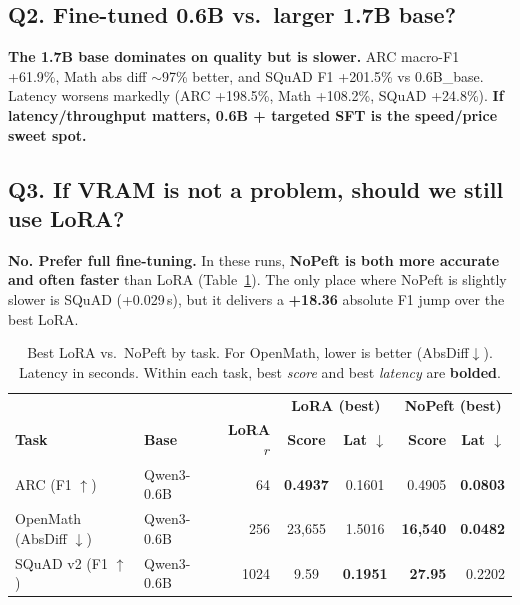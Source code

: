 \documentclass[11pt,a4paper]{article}
\begin{document}
\subsection*{Q2. Fine-tuned 0.6B vs.\ larger 1.7B base?}
\textbf{The 1.7B base dominates on quality but is slower.} 
ARC macro-F1 +61.9\%, Math abs diff $\sim$97\% better, and SQuAD F1 +201.5\% vs 0.6B\_base. Latency worsens markedly (ARC +198.5\%, Math +108.2\%, SQuAD +24.8\%). 
\textbf{If latency/throughput matters, 0.6B + targeted SFT is the speed/price sweet spot.}

\subsection*{Q3. If VRAM is not a problem, should we still use LoRA?}
\textbf{No. Prefer full fine-tuning.} In these runs, \textbf{NoPeft is both more accurate and often faster} than LoRA (Table~\ref{tab:lora_vs_nopeft}). The only place where NoPeft is slightly slower is SQuAD (+0.029\,s), but it delivers a \textbf{+18.36} absolute F1 jump over the best LoRA.

\begin{table}[htbp]
\centering
\caption{Best LoRA vs.\ NoPeft by task. For OpenMath, lower is better (AbsDiff$\downarrow$). Latency in seconds. Within each task, best \emph{score} and best \emph{latency} are \textbf{bolded}.}
\label{tab:lora_vs_nopeft}
\footnotesize
\begin{adjustbox}{max width=\textwidth}
\begin{tabular}{llrccrr}
\toprule
 & & & \multicolumn{2}{c}{\textbf{LoRA (best)}} & \multicolumn{2}{c}{\textbf{NoPeft (best)}} \\
\cmidrule(lr){4-5}\cmidrule(lr){6-7}
\textbf{Task} & \textbf{Base} & \textbf{LoRA $r$} & \textbf{Score} & \textbf{Lat $\downarrow$} & \textbf{Score} & \textbf{Lat $\downarrow$} \\
\midrule
ARC (F1 $\uparrow$) & Qwen3-0.6B & 64   & \textbf{0.4937} & 0.1601 & 0.4905 & \textbf{0.0803} \\
OpenMath (AbsDiff $\downarrow$) & Qwen3-0.6B & 256  & 23{,}655 & 1.5016 & \textbf{16{,}540} & \textbf{0.0482} \\
SQuAD v2 (F1 $\uparrow$) & Qwen3-0.6B & 1024 & 9.59 & \textbf{0.1951} & \textbf{27.95} & 0.2202 \\
\bottomrule
\end{tabular}
\end{adjustbox}
\end{table}
\end{document}
